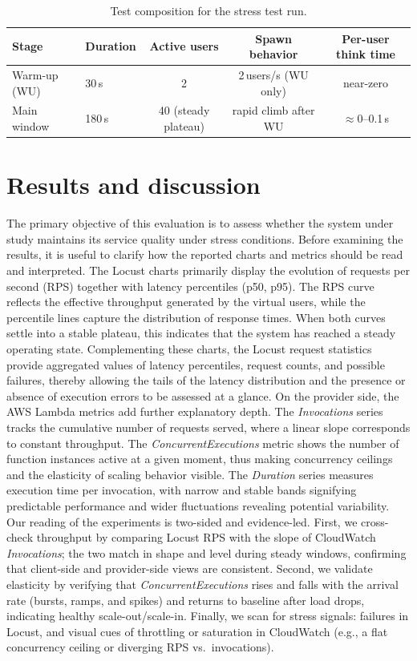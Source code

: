\documentclass[11pt,a4paper]{article}
\begin{document}
\begin{table}[h]
\centering
\small
\caption{Test composition for the stress test run.}
\label{tab:hhA-plan}
\begin{tabular}{llccc}
\toprule
Stage & Duration & Active users & Spawn behavior & Per-user think time \\
\midrule
Warm-up (WU) & 30\,s  & 2 & 2\,users/s (WU only) & near-zero \\
Main window  & 180\,s & 40 (steady plateau) & rapid climb after WU & $\approx$0--0.1\,s \\
\bottomrule
\end{tabular}
\end{table}

\section{Results and discussion}
The primary objective of this evaluation is to assess whether the system under study maintains its service quality under stress conditions. 
Before examining the results, it is useful to clarify how the reported charts and metrics should be read and interpreted. The Locust charts primarily display the evolution of requests per second (RPS) together with latency percentiles (p50, p95). The RPS curve reflects the effective throughput generated by the virtual users, while the percentile lines capture the distribution of response times. When both curves settle into a stable plateau, this indicates that the system has reached a steady operating state.
Complementing these charts, the Locust request statistics provide aggregated values of latency percentiles, request counts, and possible failures, thereby allowing the tails of the latency distribution and the presence or absence of execution errors to be assessed at a glance. On the provider side, the AWS Lambda metrics add further explanatory depth. The \emph{Invocations} series tracks the cumulative number of requests served, where a linear slope corresponds to constant throughput. The \emph{ConcurrentExecutions} metric shows the number of function instances active at a given moment, thus making concurrency ceilings and the elasticity of scaling behavior visible. The \emph{Duration} series measures execution time per invocation, with narrow and stable bands signifying predictable performance and wider fluctuations revealing potential variability. 
Our reading of the experiments is two-sided and evidence-led. First, we cross-check throughput by comparing Locust RPS with the slope of CloudWatch \emph{Invocations}; the two match in shape and level during steady windows, confirming that client-side and provider-side views are consistent. Second, we validate elasticity by verifying that \emph{ConcurrentExecutions} rises and falls with the arrival rate (bursts, ramps, and spikes) and returns to baseline after load drops, indicating healthy scale-out/scale-in. Finally, we scan for stress signals: failures in Locust, and visual cues of throttling or saturation in CloudWatch (e.g., a flat concurrency ceiling or diverging RPS vs.\ invocations).
\end{document}
